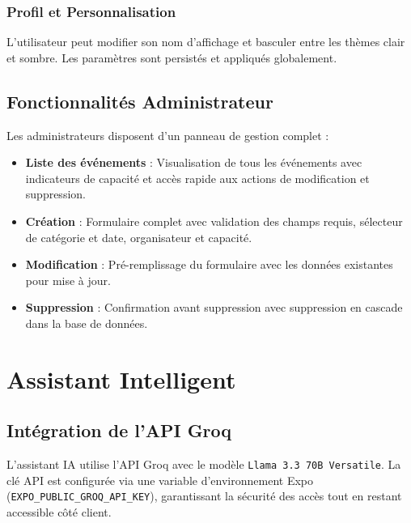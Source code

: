 \documentclass[a4paper,12pt]{report}
\begin{document}
\subsection{Profil et Personnalisation}
L'utilisateur peut modifier son nom d'affichage et basculer entre les th\`{e}mes clair et sombre. Les param\`{e}tres sont persist\'{e}s et appliqu\'{e}s globalement.

\section{Fonctionnalit\'{e}s Administrateur}

Les administrateurs disposent d'un panneau de gestion complet :

\begin{itemize}[leftmargin=2em]
    \item \textbf{Liste des \'{e}v\'{e}nements} : Visualisation de tous les \'{e}v\'{e}nements avec indicateurs de capacit\'{e} et acc\`{e}s rapide aux actions de modification et suppression.
    \item \textbf{Cr\'{e}ation} : Formulaire complet avec validation des champs requis, s\'{e}lecteur de cat\'{e}gorie et date, organisateur et capacit\'{e}.
    \item \textbf{Modification} : Pr\'{e}-remplissage du formulaire avec les donn\'{e}es existantes pour mise \`{a} jour.
    \item \textbf{Suppression} : Confirmation avant suppression avec suppression en cascade dans la base de donn\'{e}es.
\end{itemize}

\newpage

\chapter{Assistant Intelligent}

\section{Int\'{e}gration de l'API Groq}

L'assistant IA utilise l'API Groq avec le mod\`{e}le \texttt{Llama 3.3 70B Versatile}. La cl\'{e} API est configur\'{e}e via une variable d'environnement Expo (\texttt{EXPO\_PUBLIC\_GROQ\_API\_KEY}), garantissant la s\'{e}curit\'{e} des acc\`{e}s tout en restant accessible c\^{o}t\'{e} client.
\end{document}
